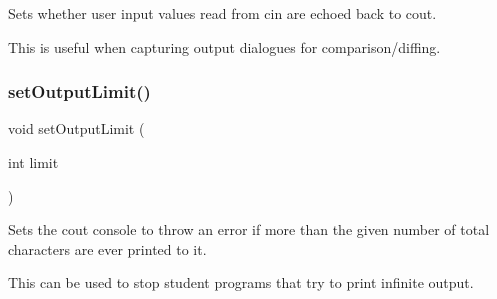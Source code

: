 Sets whether user input values read from cin are echoed back to cout. 

This is useful when capturing output dialogues for comparison/diffing. \mbox{\label{namespaceplainconsole_a95494ab13d3acc239eda093a209f4db4}} 
\subsubsection{\texorpdfstring{set\+Output\+Limit()}{setOutputLimit()}}
{\footnotesize\ttfamily void set\+Output\+Limit (\begin{DoxyParamCaption}\item[{int}]{limit }\end{DoxyParamCaption})}



Sets the cout console to throw an error if more than the given number of total characters are ever printed to it. 

This can be used to stop student programs that try to print infinite output. 